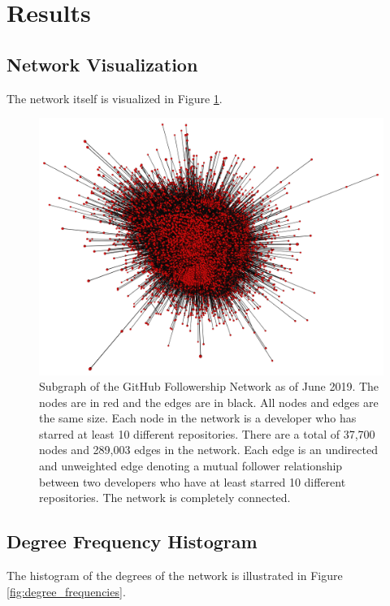 \documentclass[9pt,twocolumn,twoside]{pnas-new}
\begin{document}
\section{Results}

\subsection{Network Visualization} The network itself is visualized in Figure \ref{fig:network_visualization}.

\begin{figure}
\centering
\includegraphics[width=.8\linewidth]{network_visualization}
\caption{Subgraph of the GitHub Followership Network as of June 2019. The nodes are in red and the edges are in black. All nodes and edges are the same size. Each node in the network is a developer who has starred at least 10 different repositories. There are a total of 37,700 nodes and 289,003 edges in the network. Each edge is an undirected and unweighted edge denoting a mutual follower relationship between two developers who have at least starred 10 different repositories. The network is completely connected.
}
\label{fig:network_visualization}
\end{figure}

\subsection{Degree Frequency Histogram} The histogram of the degrees of the network is illustrated in Figure \ref{fig:degree_frequencies}.
\end{document}
